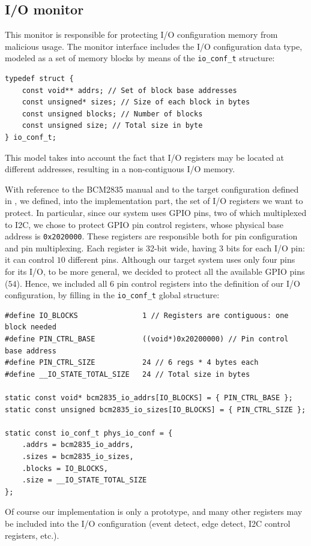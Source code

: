 \subsection{I/O monitor}
\label{sec:io_impl}

This monitor is responsible for protecting I/O configuration memory from malicious usage.
The monitor interface includes the I/O configuration data type, modeled as a set of memory blocks by means of the \verb|io_conf_t| structure:
\begin{lstlisting}
typedef struct {
	const void** addrs; // Set of block base addresses
	const unsigned* sizes; // Size of each block in bytes
	const unsigned blocks; // Number of blocks
	const unsigned size; // Total size in byte
} io_conf_t;
\end{lstlisting}
This model takes into account the fact that I/O registers may be located at different addresses, resulting in a non-contiguous I/O memory.

With reference to the BCM2835 manual \cite{bcm2835} and to the target configuration defined in ,
we defined, into the implementation part, the set of I/O registers we want to protect.
In particular, since our system uses GPIO pins, two of which multiplexed to I2C, we chose to protect GPIO pin control registers, whose physical base address is \verb|0x2020000|.
These registers are responsible both for pin configuration and pin multiplexing. Each register is 32-bit wide, having 3 bits for each I/O pin: it can control $10$ different pins.
Although our target system uses only four pins for its I/O, to be more general, we decided to protect all the available GPIO pins ($54$).
Hence, we included all $6$ pin control registers into the definition of our I/O configuration, by filling in the \verb|io_conf_t| global structure:
\begin{lstlisting}
#define IO_BLOCKS            	1 // Registers are contiguous: one block needed
#define PIN_CTRL_BASE        	((void*)0x20200000) // Pin control base address
#define PIN_CTRL_SIZE        	24 // 6 regs * 4 bytes each
#define __IO_STATE_TOTAL_SIZE	24 // Total size in bytes

static const void* bcm2835_io_addrs[IO_BLOCKS] = { PIN_CTRL_BASE };
static const unsigned bcm2835_io_sizes[IO_BLOCKS] = { PIN_CTRL_SIZE };

static const io_conf_t phys_io_conf = {
	.addrs = bcm2835_io_addrs,
	.sizes = bcm2835_io_sizes,
	.blocks = IO_BLOCKS,
	.size = __IO_STATE_TOTAL_SIZE
};
\end{lstlisting}
Of course our implementation is only a prototype, and many other registers may be included into the I/O configuration (\eg event detect, edge detect, I2C control registers, etc.).

